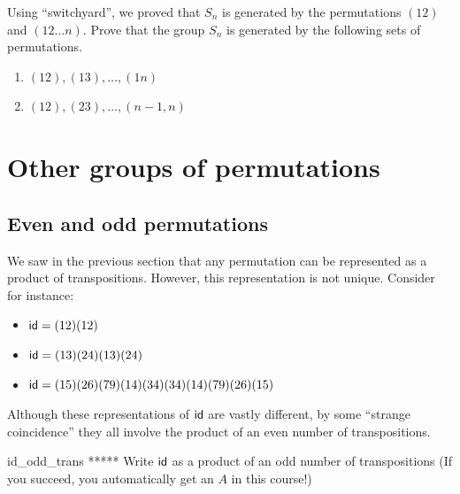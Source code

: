 \begin{exercise}{}
Using ``switchyard'', we proved that $S_n$ is generated by the permutations $(12)$ and $(12 \ldots n)$.
Prove that the group $S_n$ is generated by
the following sets of permutations.
\begin{enumerate}
 
 \item
$(1 2), (13), \ldots, (1n)$
 
 \item
$(1 2), (23), \ldots, (n- 1,n)$
 
 
\end{enumerate}
\end{exercise}

\section{Other groups of permutations }
\label{sec:Permutation:OtherGroups}

\subsection{Even and odd permutations}

We saw in the previous section that any permutation can be represented as a product of transpositions. However, this representation is not unique. Consider for instance:
\begin{itemize}
\item
${\sf{i}d}  = (1 2) ( 1 2)$
\item
${\sf{i}d}  = (1 3 )(2 4 )(1 3 )( 2 4 )$
\item
${\sf{i}d}  = (1 5 )(2 6 )(7 9 )( 1 4 )(3 4)(3 4)(1 4)(7 9)(2 6)(1 5)$
\end{itemize}

\noindent
Although these representations of ${\sf{i}d} $ are vastly different, by some ``strange coincidence'' they all involve the product of an even number of 
transpositions.  

%
%
%
%
\begin{exercise}{id_odd_trans}
***** Write ${\sf{i}d} $ as a product of an odd number of transpositions (If you succeed, you automatically get an $A$ in this course!)
\end{exercise}

